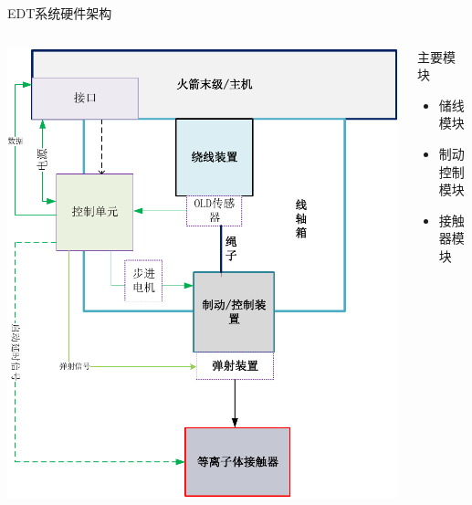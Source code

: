 \documentclass[sectioncirclenumberstyle]{le2iutbmbeamer}
\begin{document}
\begin{frame}{EDT系统硬件架构}
\begin{columns}
\begin{column}{.6\linewidth}
\includegraphics[width=\linewidth]{figures/hardwaredemo}
\end{column}%
\hfil
\begin{column}{.3\linewidth}
\begin{block}{主要模块}
\begin{itemize}
\item 储线模块
\item 制动控制模块
\item 接触器模块
\end{itemize}
\end{block}
\end{column}
\end{columns}
\end{frame}
\end{document}
